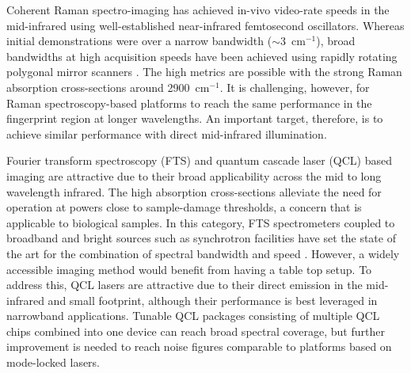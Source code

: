 \documentclass{optica-article}
\begin{document}
Coherent Raman spectro-imaging has achieved in-vivo video-rate speeds in the mid-infrared \cite{evansChemicalImagingTissue2005, saarVideoRateMolecularImaging2010} using well-established near-infrared femtosecond oscillators. Whereas initial demonstrations were over a narrow bandwidth (\mbox{$\sim$3 $\mathrm{cm^{-1}}$}), broad bandwidths at high acquisition speeds have been achieved using rapidly rotating polygonal mirror scanners \cite{tamamitsuUltrafastBroadbandFouriertransform2017, linMicrosecondFingerprintStimulated2021}. The high metrics are possible with the strong Raman absorption cross-sections around \mbox{2900 $\mathrm{cm^{-1}}$}. It is challenging, however, for Raman spectroscopy-based platforms to reach the same performance in the fingerprint region at longer wavelengths. An important target, therefore, is to achieve similar performance with direct mid-infrared illumination.

Fourier transform spectroscopy (FTS) and quantum cascade laser (QCL) based imaging are attractive due to their broad applicability across the mid to long wavelength infrared. The high absorption cross-sections alleviate the need for operation at powers close to sample-damage thresholds, a concern that is applicable to biological samples. In this category, FTS spectrometers coupled to broadband and bright sources such as synchrotron facilities have set the state of the art for the combination of spectral bandwidth and speed \cite{nasseHighresolutionFouriertransformInfrared2011}. However, a widely accessible imaging method would benefit from having a table top setup. To address this, QCL lasers are attractive due to their direct emission in the mid-infrared and small footprint, although their performance is best leveraged in narrowband applications. Tunable QCL packages consisting of multiple QCL chips combined into one device \cite{yehFastInfraredChemical2015,goyalActiveHyperspectralImaging2014,zimmerleiterQCLbasedMidinfraredHyperspectral2021} can reach broad spectral coverage, but further improvement is needed to reach noise figures comparable to platforms based on mode-locked lasers.


\end{document}
